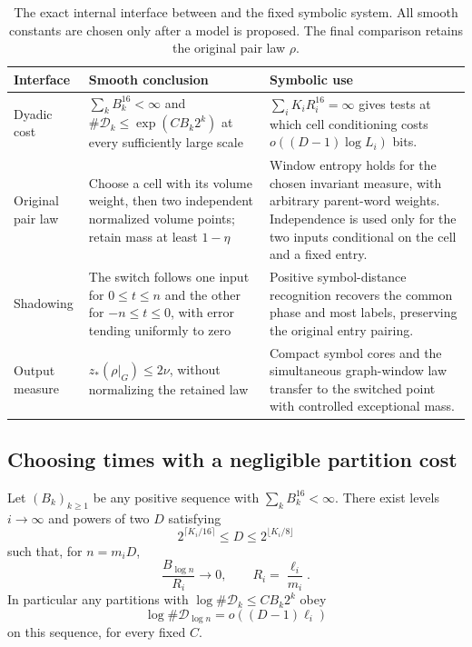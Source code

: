 \begin{table}[htbp]
\centering\small
\renewcommand{\arraystretch}{1.18}
\begin{tabular}{@{}>{\raggedright\arraybackslash}p{}>{\raggedright\arraybackslash}p{}>{\raggedright\arraybackslash}p{}@{}}
\toprule
Interface & Smooth conclusion & Symbolic use \\
\midrule
Dyadic cost &
$\sum_k B_k^{16}<\infty$ and
$\#\mathcal D_k\le\exp(CB_k2^k)$ at every sufficiently large scale &
$\sum_i K_iR_i^{16}=\infty$ gives tests at which cell conditioning
costs $o((D-1)\log L_i)$ bits. \\
Original pair law &
Choose a cell with its volume weight, then two independent normalized
volume points; retain mass at least $1-\eta$ &
Window entropy holds for the chosen invariant measure, with arbitrary
parent-word weights. Independence is used only for the two inputs
conditional on the cell and a fixed entry. \\
Shadowing &
The switch follows one input for $0\le t\le n$ and the other for
$-n\le t\le0$, with error tending uniformly to zero &
Positive symbol-distance recognition recovers the common phase and
most labels, preserving the original entry pairing. \\
Output measure &
$z_*(\rho|_G)\le2\nu$, without normalizing the retained law &
Compact symbol cores and the simultaneous graph-window law transfer
to the switched point with controlled exceptional mass. \\
\bottomrule
\end{tabular}
\caption{The exact internal interface between
 and the fixed symbolic system.
All smooth constants are chosen only after a model is proposed.
The final comparison retains the original pair law $\rho$.}
\label{tab:interfaces}
\end{table}

\subsection{Choosing times with a negligible partition cost}

\begin{lemma}\label{lem:cheap-scales}
Let $(B_k)_{k\ge1}$ be any positive sequence with
$\sum_k B_k^{16}<\infty$. There exist levels $i\to\infty$ and
powers of two $D$ satisfying
\[
 2^{\lceil K_i/16\rceil}\le D\le2^{\lfloor K_i/8\rfloor}
\]
such that, for $n=m_iD$,
\begin{equation}\label{eq:relative-cost}
 \frac{B_{\log n}}{R_i}\longrightarrow0,
 \qquad R_i=\frac{\ell_i}{m_i}.
\end{equation}
In particular any partitions with
$\log\#\mathcal D_k\le C B_k2^k$ obey
\begin{equation}\label{eq:cheap-partition}
 \log\#\mathcal D_{\log n}=o((D-1)\ell_i)
\end{equation}
on this sequence, for every fixed $C$.
\end{lemma}


